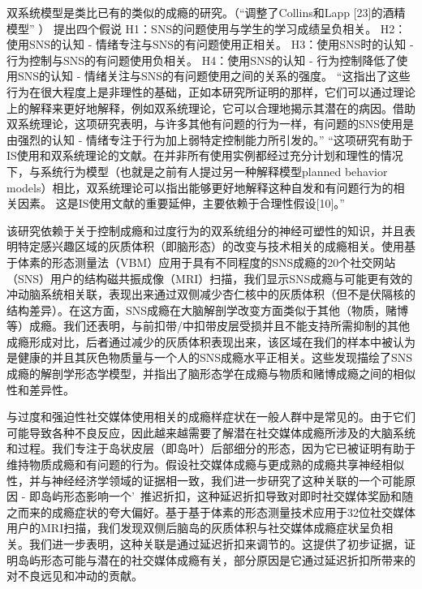 双系统模型是类比已有的类似的成瘾的研究。（“调整了Collins和Lapp [23]的酒精模型” ）
提出四个假说
            H1：SNS的问题使用与学生的学习成绩呈负相关。
            H2：使用SNS的认知 - 情绪专注与SNS的有问题使用正相关。
            H3：使用SNS时的认知 - 行为控制与SNS的有问题使用负相关。
            H4：使用SNS的认知 - 行为控制降低了使用SNS的认知 - 情绪关注与SNS的有问题使用之间的关系的强度。
“这指出了这些行为在很大程度上是非理性的基础，正如本研究所证明的那样，它们可以通过理论上的解释来更好地解释，例如双系统理论，它可以合理地揭示其潜在的病因。借助双系统理论，这项研究表明，与许多其他有问题的行为一样，有问题的SNS使用是由强烈的认知 - 情绪专注于行为加上弱特定控制能力所引发的。”
“这项研究有助于IS使用和双系统理论的文献。在并非所有使用实例都经过充分计划和理性的情况下，与系统行为模型（也就是之前有人提过另一种解释模型planned behavior models）相比，双系统理论可以指出能够更好地解释这种自发和有问题行为的相关因素。 这是IS使用文献的重要延伸，主要依赖于合理性假设[10]。”\cite{he2017brain}


该研究依赖于关于控制成瘾和过度行为的双系统组分的神经可塑性的知识，并且表明特定感兴趣区域的灰质体积（即脑形态）的改变与技术相关的成瘾相关。使用基于体素的形态测量法（VBM）应用于具有不同程度的SNS成瘾的20个社交网站（SNS）用户的结构磁共振成像（MRI）扫描，我们显示SNS成瘾与可能更有效的冲动脑系统相关联，表现出来通过双侧减少杏仁核中的灰质体积（但不是伏隔核的结构差异）。在这方面，SNS成瘾在大脑解剖学改变方面类似于其他（物质，赌博等）成瘾。我们还表明，与前扣带/中扣带皮层受损并且不能支持所需抑制的其他成瘾形成对比，后者通过减少的灰质体积表现出来，该区域在我们的样本中被认为是健康的并且其灰色物质量与一个人的SNS成瘾水平正相关。这些发现描绘了SNS成瘾的解剖学形态学模型，并指出了脑形态学在成瘾与物质和赌博成瘾之间的相似性和差异性。\cite{he2017brain}

与过度和强迫性社交媒体使用相关的成瘾样症状在一般人群中是常见的。由于它们可能导致各种不良反应，因此越来越需要了解潜在社交媒体成瘾所涉及的大脑系统和过程。我们专注于岛状皮层（即岛叶）后部细分的形态，因为它已被证明有助于维持物质成瘾和有问题的行为。假设社交媒体成瘾与更成熟的成瘾共享神经相似性，并与神经经济学领域的证据相一致，我们进一步研究了这种关联的一个可能原因 - 即岛屿形态影响一个' 推迟折扣，这种延迟折扣导致对即时社交媒体奖励和随之而来的成瘾症状的夸大偏好。基于基于体素的形态测量技术应用于32位社交媒体用户的MRI扫描，我们发现双侧后脑岛的灰质体积与社交媒体成瘾症状呈负相关。我们进一步表明，这种关联是通过延迟折扣来调节的。这提供了初步证据，证明岛屿形态可能与潜在的社交媒体成瘾有关，部分原因是它通过延迟折扣所带来的对不良远见和冲动的贡献。\cite{turel2018delay}

